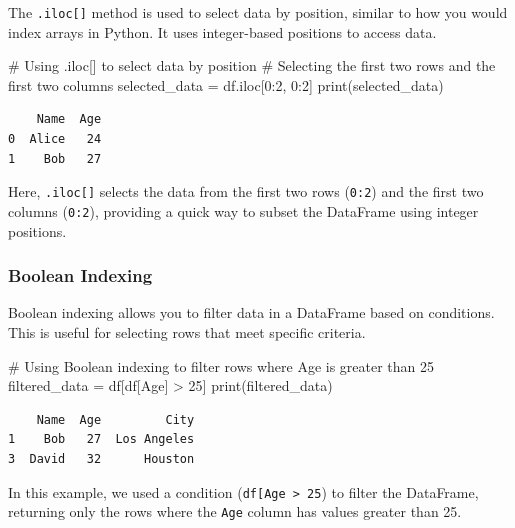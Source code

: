 \documentclass[
  letterpaper,
  DIV=11,
  numbers=noendperiod]{scrreprt}
\newenvironment{Shaded}{\begin{snugshade}}{\end{snugshade}}
\newcommand{\BuiltInTok}[1]{\textcolor[rgb]{0.00,0.23,0.31}{#1}}
\newcommand{\CommentTok}[1]{\textcolor[rgb]{0.37,0.37,0.37}{#1}}
\newcommand{\DecValTok}[1]{\textcolor[rgb]{0.68,0.00,0.00}{#1}}
\newcommand{\NormalTok}[1]{\textcolor[rgb]{0.00,0.23,0.31}{#1}}
\newcommand{\OperatorTok}[1]{\textcolor[rgb]{0.37,0.37,0.37}{#1}}
\newcommand{\StringTok}[1]{\textcolor[rgb]{0.13,0.47,0.30}{#1}}
\begin{document}
The \texttt{.iloc{[}{]}} method is used to select data by position,
similar to how you would index arrays in Python. It uses integer-based
positions to access data.

\begin{Shaded}
\begin{Highlighting}[]
\CommentTok{\# Using .iloc[] to select data by position}
\CommentTok{\# Selecting the first two rows and the first two columns}
\NormalTok{selected\_data }\OperatorTok{=}\NormalTok{ df.iloc[}\DecValTok{0}\NormalTok{:}\DecValTok{2}\NormalTok{, }\DecValTok{0}\NormalTok{:}\DecValTok{2}\NormalTok{]}
\BuiltInTok{print}\NormalTok{(selected\_data)}
\end{Highlighting}
\end{Shaded}

\begin{verbatim}
    Name  Age
0  Alice   24
1    Bob   27
\end{verbatim}

Here, \texttt{.iloc{[}{]}} selects the data from the first two rows
(\texttt{0:2}) and the first two columns (\texttt{0:2}), providing a
quick way to subset the DataFrame using integer positions.

\hypertarget{boolean-indexing}{%
\subsubsection{Boolean Indexing}\label{boolean-indexing}}

Boolean indexing allows you to filter data in a DataFrame based on
conditions. This is useful for selecting rows that meet specific
criteria.

\begin{Shaded}
\begin{Highlighting}[]
\CommentTok{\# Using Boolean indexing to filter rows where Age is greater than 25}
\NormalTok{filtered\_data }\OperatorTok{=}\NormalTok{ df[df[}\StringTok{\textquotesingle{}Age\textquotesingle{}}\NormalTok{] }\OperatorTok{\textgreater{}} \DecValTok{25}\NormalTok{]}
\BuiltInTok{print}\NormalTok{(filtered\_data)}
\end{Highlighting}
\end{Shaded}

\begin{verbatim}
    Name  Age         City
1    Bob   27  Los Angeles
3  David   32      Houston
\end{verbatim}

In this example, we used a condition
(\texttt{df{[}\textquotesingle{}Age\textquotesingle{}{]}\ \textgreater{}\ 25})
to filter the DataFrame, returning only the rows where the \texttt{Age}
column has values greater than 25.
\end{document}
